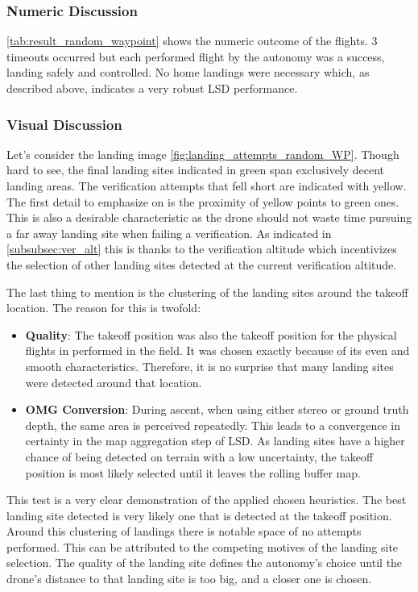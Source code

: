     \subsubsection{Numeric Discussion}
    \cref{tab:result_random_waypoint} shows the numeric outcome of the flights. 3 timeouts occurred but each performed flight by the autonomy was a success, landing safely and controlled. No home landings were necessary which, as described above, indicates a very robust LSD performance. 

    \subsubsection{Visual Discussion}
    Let's consider the landing image \ref{fig:landing_attempts_random_WP}. Though hard to see, the final landing sites indicated in green span exclusively decent landing areas. The verification attempts that fell short are indicated with yellow. The first detail to emphasize on is the proximity of yellow points to green ones. This is also a desirable characteristic as the drone should not waste time pursuing a far away landing site when failing a verification. As indicated in \cref{subsubsec:ver_alt} this is thanks to the verification altitude which incentivizes the selection of other landing sites detected at the current verification altitude.

    The last thing to mention is the clustering of the landing sites around the takeoff location. The reason for this is twofold:
    \begin{itemize}
        \item \textbf{Quality}: The takeoff position was also the takeoff position for the physical flights in performed in the field. It was chosen exactly because of its even and smooth characteristics. Therefore, it is no surprise that many landing sites were detected around that location.
        \item \textbf{OMG Conversion}: During ascent, when using either stereo or ground truth depth, the same area is perceived repeatedly. This leads to a convergence in certainty in the map aggregation step of LSD. As landing sites have a higher chance of being detected on terrain with a low uncertainty, the takeoff position is most likely selected until it leaves the rolling buffer map.
    \end{itemize}

    This test is a very clear demonstration of the applied chosen heuristics. The best landing site detected is very likely one that is detected at the takeoff position. Around this clustering of landings there is notable space of no attempts performed. This can be attributed to the competing motives of the landing site selection. The quality of the landing site defines the autonomy's choice until the drone's distance to that landing site is too big, and a closer one is chosen. 

